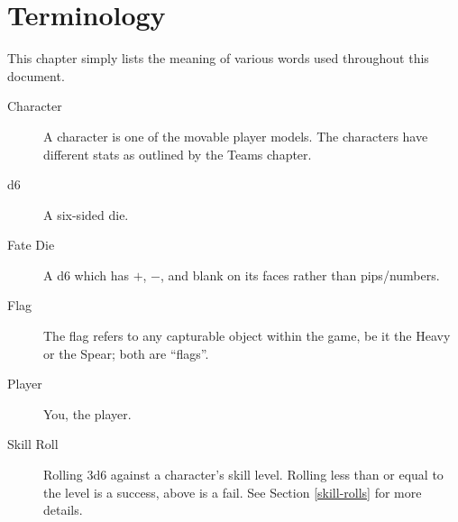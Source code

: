 \chapter{Terminology}
This chapter simply lists the meaning of various words used throughout this document.

\begin{description}
\item[Character] A character is one of the movable player models.
The characters have different stats as outlined by the Teams chapter.
\item[d6] A six-sided die.
\item[Fate Die] A d6 which has $+$, $-$, and blank on its faces rather than pips/numbers.
\item[Flag] The flag refers to any capturable object within the game, be it the Heavy or the Spear; both are ``flags''.
\item[Player] You, the player.
\item[Skill Roll] Rolling 3d6 against a character's skill level.
Rolling less than or equal to the level is a success, above is a fail.
See Section \ref{skill-rolls} for more details.
\end{description}
